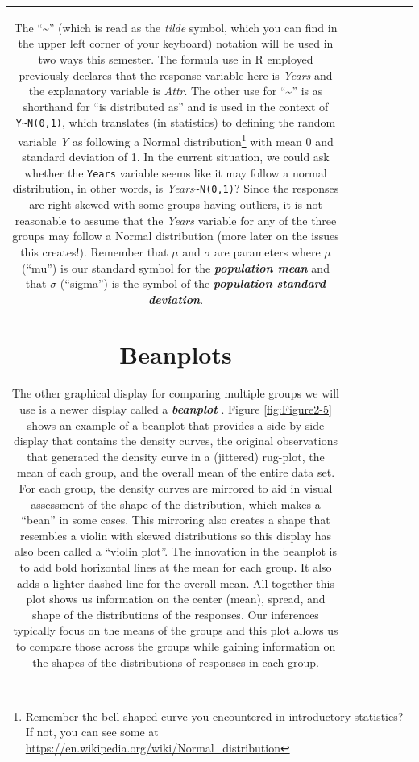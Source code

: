 \documentclass[]{book}
\let\rmarkdownfootnote\footnote%
\def\footnote{\protect\rmarkdownfootnote}
\theoremstyle{definition}
\theoremstyle{definition}
\theoremstyle{remark}
\begin{document}
\begin{longtable}[]{@{}ccccccc@{}}
\begin{minipage}[b]{0.10\columnwidth}
The ``\textasciitilde{}'' (which is read as the \emph{tilde} symbol,
which you can find in the upper left corner of your keyboard) notation
will be used in two ways this semester. The formula use in R employed
previously declares that the response variable here is \emph{Years} and
the explanatory variable is \emph{Attr}. The other use for
``\textasciitilde{}'' is as shorthand for ``is distributed as'' and is
used in the context of \texttt{Y\textasciitilde{}N(0,1)}, which
translates (in statistics) to defining the random variable \emph{Y} as
following a Normal distribution\footnote{Remember the bell-shaped curve
  you encountered in introductory statistics? If not, you can see some
  at \url{https://en.wikipedia.org/wiki/Normal_distribution}} with mean
0 and standard deviation of 1. In the current situation, we could ask
whether the \texttt{Years} variable seems like it may follow a normal
distribution, in other words, is
\emph{Years}\texttt{\textasciitilde{}N(0,1)}? Since the responses are
right skewed with some groups having outliers, it is not reasonable to
assume that the \emph{Years} variable for any of the three groups may
follow a Normal distribution (more later on the issues this creates!).
Remember that \(\mu\) and \(\sigma\) are parameters where \(\mu\)
(``mu'') is our standard symbol for the \textbf{\emph{population mean}}
and that \(\sigma\) (``sigma'') is the symbol of the
\textbf{\emph{population standard deviation}}.

\section{Beanplots}\label{section2-2}

The other graphical display for comparing multiple groups we will use is
a newer display called a \textbf{\emph{beanplot}} \citep{Kampstra2008}.
Figure \ref{fig:Figure2-5} shows an example of a beanplot that provides
a side-by-side display that contains the density curves, the original
observations that generated the density curve in a (jittered) rug-plot,
the mean of each group, and the overall mean of the entire data set. For
each group, the density curves are mirrored to aid in visual assessment
of the shape of the distribution, which makes a ``bean'' in some cases.
This mirroring also creates a shape that resembles a violin with skewed
distributions so this display has also been called a ``violin plot''.
The innovation in the beanplot is to add bold horizontal lines at the
mean for each group. It also adds a lighter dashed line for the overall
mean. All together this plot shows us information on the center (mean),
spread, and shape of the distributions of the responses. Our inferences
typically focus on the means of the groups and this plot allows us to
compare those across the groups while gaining information on the shapes
of the distributions of responses in each group.


\end{minipage}
\end{longtable}
\end{document}
